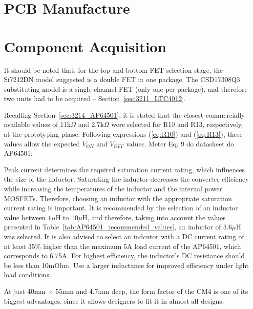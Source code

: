 \section{PCB Manufacture}\label{sec:51_PCBmanufacture}

\section{Component Acquisition}\label{sec:52_ComponentAcquisition}



It should be noted that, for the top and bottom FET selection stage, the Si7212DN model suggested is a double FET in one package. The CSD17308Q3 substituting model is a single-channel FET (only one per package), and therefore two units had to be acquired -- Section~\ref{sec:3211_LTC4012}.

Recalling Section~\ref{sec:3214_AP64501}, it is stated that the closest commercially available values of 11k$\Omega$ and 2.7k$\Omega$ were selected for R10 and R13, respectively, at the prototyping phase. Following expressions (\ref{eq:R10}) and (\ref{eq:R13}), these values allow the expected $V_{ON}$ and $V_{OFF}$ values.
    Meter Eq. 9 do datasheet do AP64501;
    
    Peak current determines the required saturation current rating, which influences the size of the inductor. Saturating the inductor decreases the converter efficiency while increasing the temperatures of the inductor and the internal power MOSFETs. Therefore, choosing an inductor with the appropriate saturation current rating is important. 
    It is recommended by \cite{AP64501} the selection of an inductor value between $1 \mu$H to $10 \mu$H, and therefore, taking into account the values presented in Table~\ref{tab:AP64501_recommended_values}, an inductor of $3.6 \mu$H was selected. It is also advised to select an indcutor with a DC current rating of at least 35\% higher than the maximum 5A load current of the AP64501, which corresponds to 6.75A.
    For highest efficiency, the inductor's DC resistance should be less than 10mOhm. Use a larger inductance for improved efficiency under light load conditions.


    At just 40mm $\times$ 55mm and 4.7mm deep, the form factor of the CM4 is one of its biggest advantages, since it allows designers to fit it in almost all designs.

